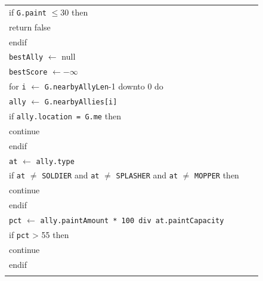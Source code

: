 \documentclass{article}
\newenvironment{pseudobox}
{
\centering
\begin{longtable}{|p{0.94\linewidth}|}
\hline
}
{
\\ \hline
\end{longtable}
\vspace{0.05cm}
}
\begin{document}
\begin{enumerate}[label=\alph*.]
\begin{enumerate}[label=\alph*.]
\begin{pseudobox}
\hspace*{1.5em}if \texttt{G.paint} $\leq 30$ then \\
\hspace*{3em}return false \\
\hspace*{1.5em}endif \\

\hspace*{1.5em}\texttt{bestAlly} $\leftarrow$ null \\
\hspace*{1.5em}\texttt{bestScore} $\leftarrow -\infty$ \\

\hspace*{1.5em}for \texttt{i} $\leftarrow$ \texttt{G.nearbyAllyLen}-1 downto 0 do \\
\hspace*{3em}\texttt{ally} $\leftarrow$ \texttt{G.nearbyAllies[i]} \\

\hspace*{3em}if \texttt{ally.location = G.me} then \\
\hspace*{4.5em}continue \\
\hspace*{3em}endif \\

\hspace*{3em}\texttt{at} $\leftarrow$ \texttt{ally.type} \\
\hspace*{3em}if \texttt{at} $\neq$ \texttt{SOLDIER} and \texttt{at} $\neq$ \texttt{SPLASHER} and \texttt{at} $\neq$ \texttt{MOPPER} then \\
\hspace*{4.5em}continue \\
\hspace*{3em}endif \\

\hspace*{3em}\texttt{pct} $\leftarrow$ \texttt{ally.paintAmount * 100 div at.paintCapacity} \\
\hspace*{3em}if \texttt{pct} > 55 then \\
\hspace*{4.5em}continue \\
\hspace*{3em}endif \\


\end{pseudobox}
\end{enumerate}
\end{enumerate}
\end{document}

